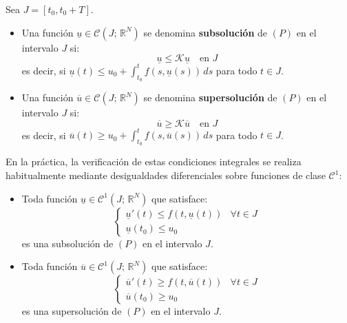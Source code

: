 \begin{definición}\label{def:sub_supersolucion}
    Sea $J = [t_0, t_0 + T]$.
    \begin{itemize}
        \item Una función $\underline{u} \in \mathcal{C}(J; \, \mathbb{R}^N)$ se denomina \textbf{subsolución} de $(P)$ en el intervalo $J$ si:
        \[
            \underline{u} \leq \mathcal{K}\underline{u} \quad \text{en } J
        \]
        es decir, si $\underline{u}(t) \leq u_0 + \displaystyle\int_{t_0}^t f(s, \underline{u}(s)) \, ds$ para todo $t \in J$.
        \item Una función $\overline{u} \in \mathcal{C}(J; \, \mathbb{R}^N)$ se denomina \textbf{supersolución} de $(P)$ en el intervalo $J$ si:
        \[
            \overline{u} \geq \mathcal{K}\overline{u} \quad \text{en } J
        \]
        es decir, si $\overline{u}(t) \geq u_0 + \displaystyle\int_{t_0}^t f(s, \overline{u}(s)) \, ds$ para todo $t \in J$.
    \end{itemize}
\end{definición}

En la práctica, la verificación de estas condiciones integrales se realiza habitualmente mediante desigualdades diferenciales sobre funciones de clase $\mathcal{C}^1$:

\begin{lema}\label{lem:caracterizacion_sub_supersoluciones}
    \begin{itemize}
        \item Toda función $\underline{u} \in \mathcal{C}^1(J; \, \mathbb{R}^N)$ que satisface:
        \[
            \begin{cases}
                \underline{u}'(t) \leq f(t, \underline{u}(t)) & \forall t \in J \\
                \underline{u}(t_0) \leq u_0
            \end{cases}
        \]
        es una subsolución de $(P)$ en el intervalo $J$.
        \item Toda función $\overline{u} \in \mathcal{C}^1(J; \, \mathbb{R}^N)$ que satisface:
        \[
            \begin{cases}
                \overline{u}'(t) \geq f(t, \overline{u}(t)) & \forall t \in J \\
                \overline{u}(t_0) \geq u_0
            \end{cases}
        \]
        es una supersolución de $(P)$ en el intervalo $J$.
    \end{itemize}
\end{lema}

